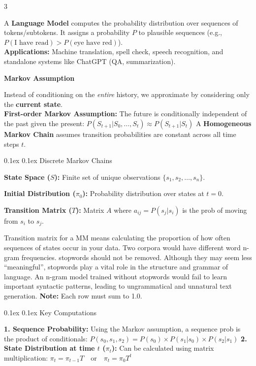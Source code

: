 \documentclass[8pt,landscape]{article}
\makeatletter
\renewcommand{\section}{\@startsection{section}{2}{0pt}%
{0.1ex}%
{0.1ex}%
{\fontsize{8}{9}\bfseries\color{red}}}
\renewcommand{\subsection}{\@startsection{subsection}{2}{0pt}%
{0.1ex}%
{0.1ex}%
{\fontsize{8}{9}\bfseries\color{blue}}}
\newcommand{\smalltext}[1]{
{\fontsize{8}{9}\selectfont\sloppy #1\par}
}
\makeatother
\begin{document}
\fontsize{8}{9}\selectfont
\pagestyle{empty}
\begin{multicols}{3}

\smalltext{
A \textbf{Language Model} computes the probability distribution over sequences of tokens/subtokens. It assigns a probability $P$ to plausible sequences (e.g., $P(\text{I have read}) > P(\text{eye have red})$). \\
\textbf{Applications:} Machine translation, spell check, speech recognition, and standalone systems like ChatGPT (QA, summarization).
}

\textbf{Markov Assumption}
\smalltext{
Instead of conditioning on the \textit{entire} history, we approximate by considering only the \textbf{current state}. \\
\textbf{First-order Markov Assumption:} The future is conditionally independent of the past given the present:
$ P(S_{t+1} | S_0, \dots, S_t) \approx P(S_{t+1} | S_t) $
A \textbf{Homogeneous Markov Chain} assumes transition probabilities are constant across all time steps $t$.
}

\section{Discrete Markov Chains}
\smalltext{
\textbf{State Space ($S$):} Finite set of unique observations $\{s_1, s_2, \dots, s_n\}$.

\textbf{Initial Distribution ($\pi_0$):} Probability distribution over states at $t=0$.

\textbf{Transition Matrix ($T$):} Matrix $A$ where $a_{ij} = P(s_j | s_i)$ is the prob of moving from $s_i$ to $s_j$. 

Transition matrix for a MM means calculating the proportion of how often sequences of states occur in your data.
Two corpora would have different word n-gram frequencies.
stopwords should not be removed. Although they may seem less “meaningful”, stopwords play a vital role in the structure and grammar of language. An n-gram model trained without stopwords would fail to learn important syntactic patterns, leading to ungrammatical and unnatural text generation.
\textbf{Note:} Each row must sum to 1.0.
}

\subsection{Key Computations}
\smalltext{
\textbf{1. Sequence Probability:} Using the Markov assumption, a sequence prob is the product of conditionals:
$ P(s_0, s_1, s_2) = P(s_0) \times P(s_1|s_0) \times P(s_2|s_1) $
\textbf{2. State Distribution at time $t$ ($\pi_t$):}
Can be calculated using matrix multiplication:
$ \pi_t = \pi_{t-1} T \quad \text{or} \quad \pi_t = \pi_0 T^t $
}


\end{multicols}
\end{document}
